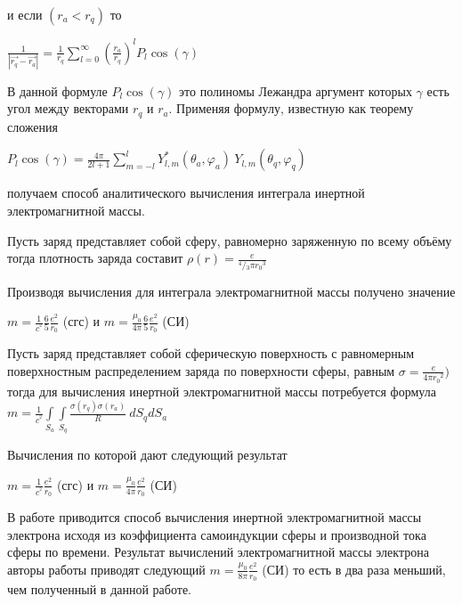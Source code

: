 \documentclass{article}
\begin{document}
и если $\left( {{r}_{a}}<{{r}_{q}} \right)$ то

$\frac{1}{\left| \overrightarrow{{{r}_{q}}}-\overrightarrow{{{r}_{a}}} \right|}=\frac{1}{{{r}_{q}}}\sum\limits_{l=0}^{\infty }{{{\left( \frac{{{r}_{a}}}{{{r}_{q}}} \right)}^{l}}{{P}_{l}} \cos \left( \gamma  \right)}$

В данной формуле ${{P}_{l}} \cos \left( \gamma  \right)$ это полиномы Лежандра аргумент которых $\gamma$ есть угол между векторами ${{r}_{q}}$  и ${{r}_{a}}$. Применяя формулу, известную как теорему сложения

${{P}_{l}}\cos \left( \gamma  \right)=\frac{4\pi }{2l+1}\sum\limits_{m=-l}^{l}{Y_{l,m}^{*}\left( {{\theta }_{a}},{{\varphi }_{a}} \right)}\ {{Y}_{l,m}}\left( {{\theta }_{q}},{{\varphi }_{q}} \right)$

получаем способ аналитического вычисления интеграла инертной электромагнитной массы.

Пусть заряд представляет собой сферу, равномерно заряженную по всему объёму тогда плотность заряда составит $\rho \left( r \right)=\frac{e}{{}^{4}/{}_{3}\pi {{r}_{0}}^{3}}$

Производя вычисления для интеграла электромагнитной массы получено значение 

$m =\frac{1}{{{c}^{^{2}}}}\frac{6}{5}\frac{e^2}{{{r}_{0}}}$ (сгс) и
$m =\frac{{{\mu }_{0}}}{4\pi }\frac{6}{5}\frac{e^2}{{{r}_{0}}}$ (СИ)

Пусть заряд представляет собой сферическую поверхность с равномерным поверхностным распределением заряда по поверхности сферы, равным $\sigma=\frac{e}{4\pi {{r}_{0}}^{2}})$ тогда для вычисления инертной электромагнитной массы потребуется формула
$m=\frac{1}{{{c}^{^{2}}}}\int\limits_{{{S}_{a}}}{\int\limits_{{{S}_{q}}}{\frac{\sigma \left( {{r}_{q}} \right)\sigma \left( {{r}_{a}} \right)}{R}}}\ d{{S}_{q}}d{{S}_{a}}$

Вычисления по которой дают следующий результат

$m =\frac{1}{{{c}^{^{2}}}}\frac{e^2}{{{r}_{0}}}$ (сгс) и
$m =\frac{{{\mu }_{0}}}{4\pi }\frac{e^2}{{{r}_{0}}}$ (СИ)

В работе \cite{misyuchenko} приводится способ вычисления инертной электромагнитной массы электрона исходя из коэффициента самоиндукции сферы и производной тока сферы по времени. Результат вычислений электромагнитной массы электрона авторы работы \cite{misyuchenko} приводят следующий $m =\frac{{{\mu }_{0}}}{8\pi }\frac{e^2}{{{r}_{0}}}$ (СИ) то есть в два раза меньший, чем полученный в данной работе.
\end{document}
